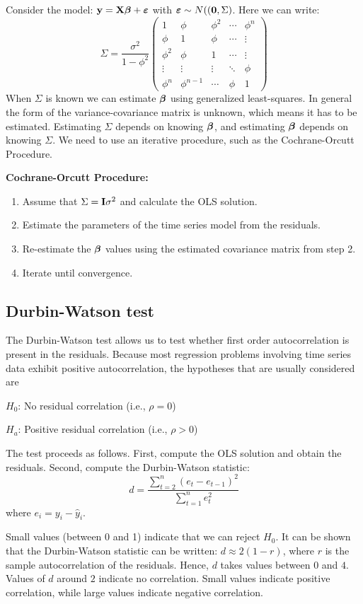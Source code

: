 Consider the model: $\mathbf{y} = \mathbf{X} \mbox{\boldmath $\beta$} + \mbox{\boldmath $\varepsilon$}$ with $\mbox{\boldmath $\varepsilon$} \sim N((\mathbf{0}, \Sigma)$.
Here we can write:
$$
\Sigma = \frac{\sigma^2}{1-\phi^2} \left(\begin{array}{ccccc}
        1 & \phi  & \phi^2  & \cdots & \phi^n  \\
        \phi & 1 & \phi & \cdots & \vdots \\
        \phi^2 & \phi & 1 & \cdots & \vdots \\
        \vdots & \vdots & \vdots &\ddots & \phi \\
        \phi^n & \phi^{n-1} & \cdots & \phi & 1
\end{array}\right)
$$
When $\Sigma$ is known we can estimate $\mbox{\boldmath $\beta$}$ using generalized least-squares.
In general the form of the variance-covariance matrix is unknown, which means it has to be estimated.
Estimating $\Sigma$ depends on knowing $\mbox{\boldmath $\beta$}$, and estimating $\mbox{\boldmath $\beta$}$ depends on knowing $\Sigma$. 
We need to use an iterative procedure, such as the Cochrane-Orcutt Procedure.

\vb
{\bf Cochrane-Orcutt Procedure:}
\begin{enumerate}
\item Assume that $\Sigma = \mathbf{I} \sigma^2$ and calculate the OLS solution.
\item Estimate the parameters of the time series model from the residuals.
\item Re-estimate the $\mbox{\boldmath $\beta$}$ values using  the estimated covariance matrix from step 2.
\item Iterate until convergence.
\end{enumerate}


\subsection{Durbin-Watson test}

The Durbin-Watson test allows us to test whether first order autocorrelation is present in the residuals.
Because most regression problems involving time series data exhibit positive autocorrelation, the hypotheses that are usually considered are

\hskip1cm  $H_0$: No residual correlation (i.e., $\rho = 0$)

\hskip1cm   $H_a$: Positive residual correlation (i.e., $\rho > 0$)


The test proceeds as follows. First, compute the OLS solution and obtain the residuals. Second, compute the Durbin-Watson statistic:
$$
d = \frac{\sum_{t=2}^n (e_t - e_{t-1})^2}{\sum_{t=1}^n e_t^2}
$$
where $e_i = y_i - \hat y_i$.

Small values (between 0 and 1) indicate that we can reject $H_0$. It can be shown that the Durbin-Watson statistic can be written: $d \approx 2(1-r)$, where $r$ is the sample autocorrelation of the residuals. Hence, $d$ takes values between $0$ and $4$. Values of $d$ around $2$ indicate no correlation. Small values indicate positive correlation, while large values indicate negative correlation.



